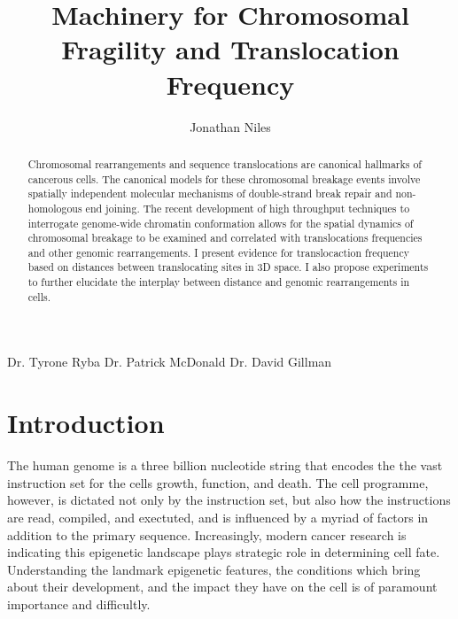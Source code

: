 \documentclass[phd,tocprelim]{cornell}
\title{Machinery for Chromosomal Fragility and Translocation Frequency}
\author{Jonathan Niles}
\begin{document}
\maketitle
\makecopyright

\begin{abstract}
Chromosomal rearrangements and sequence translocations are
canonical hallmarks of cancerous cells.  The canonical models
for these chromosomal breakage events involve spatially
independent molecular mechanisms of double-strand break
repair and non-homologous end joining.  The recent development of high
throughput techniques to interrogate genome-wide chromatin
conformation allows for the spatial dynamics of chromosomal
breakage to be examined and correlated with translocations
frequencies and other genomic rearrangements.  I present
evidence for translocaction frequency based on distances between
translocating sites in 3D space.  I also propose experiments
to further elucidate the interplay between distance and
genomic rearrangements in cells.
\end{abstract}


\begin{acknowledgements}
Dr. Tyrone Ryba
Dr. Patrick McDonald
Dr. David Gillman
\end{acknowledgements}

\contentspage
\tablelistpage
\figurelistpage

\normalspacing \setcounter{page}{1} 
\pagestyle{cornell} \addtolength{\parskip}{0.5\baselineskip}

\chapter{Introduction}

The human genome is a three billion nucleotide string that encodes the
the vast instruction set for the cells growth, function, and death.  The cell
programme, however, is dictated not only by the instruction set, but also
how the instructions are read, compiled, and exectuted, and is influenced
by a myriad of factors in addition to the primary sequence.  Increasingly,
modern cancer research is indicating this epigenetic landscape plays strategic
role in determining cell fate.  Understanding the landmark epigenetic features,
the conditions which bring about their development, and the impact they have on
the cell is of paramount importance and difficultly.
\end{document}
